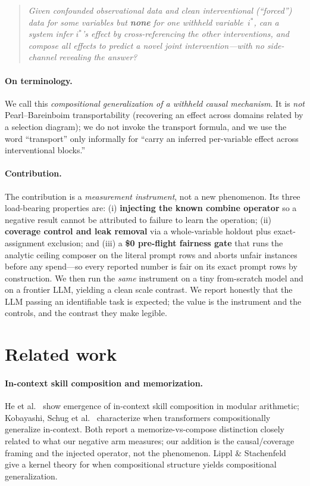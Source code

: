 \documentclass[11pt]{article}
\newcommand{\istar}{i^{\!*}}
\begin{document}
\begin{quote}
\emph{Given confounded observational data and clean interventional (``forced'') data for some variables but
\textbf{none} for one withheld variable~$\istar$, can a system infer $\istar$'s effect by cross-referencing
the other interventions, and compose all effects to predict a novel joint intervention---with no
side-channel revealing the answer?}
\end{quote}

\paragraph{On terminology.} We call this \emph{compositional generalization of a withheld causal
mechanism}. It is \emph{not} Pearl--Bareinboim transportability (recovering an effect across domains related
by a selection diagram); we do not invoke the transport formula, and we use the word ``transport'' only
informally for ``carry an inferred per-variable effect across interventional blocks.''

\paragraph{Contribution.} The contribution is a \emph{measurement instrument}, not a new phenomenon. Its
three load-bearing properties are: (i) \textbf{injecting the known combine operator} so a negative result
cannot be attributed to failure to learn the operation; (ii) \textbf{coverage control and leak removal} via
a whole-variable holdout plus exact-assignment exclusion; and (iii) a \textbf{\$0 pre-flight fairness
gate} that runs the analytic ceiling composer on the literal prompt rows and aborts unfair instances before
any spend---so every reported number is fair on its exact prompt rows by construction. We then run the \emph{same} instrument on a tiny from-scratch model and on a frontier LLM,
yielding a clean scale contrast. We report honestly that the LLM passing an identifiable task is expected;
the value is the instrument and the controls, and the contrast they make legible.

\section{Related work}
\paragraph{In-context skill composition and memorization.} He et al.~\cite{he2024grok} show emergence of
in-context skill composition in modular arithmetic; Kobayashi, Schug et al.~\cite{kobayashi2024when}
characterize when transformers compositionally generalize in-context. Both report a memorize-vs-compose
distinction closely related to what our negative arm measures; our addition is the causal/coverage framing
and the injected operator, not the phenomenon. Lippl \& Stachenfeld~\cite{lippl2025kernel} give a kernel
theory for when compositional structure yields compositional generalization.
\end{document}
